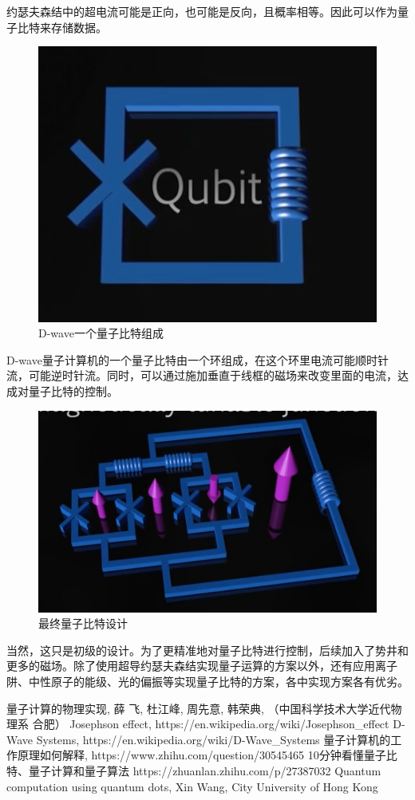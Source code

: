 \documentclass{article}
\begin{document}
约瑟夫森结中的超电流可能是正向，也可能是反向，且概率相等。因此可以作为量子比特来存储数据。
\begin{figure}[H]
  \centering
  \includegraphics[width=0.5\linewidth]{figures/D-wave一个量子比特组成}
  \caption{D-wave一个量子比特组成}
\end{figure}
D-wave量子计算机的一个量子比特由一个环组成，在这个环里电流可能顺时针流，可能逆时针流。同时，可以通过施加垂直于线框的磁场来改变里面的电流，达成对量子比特的控制。
\begin{figure}[H]
  \centering
  \includegraphics[width=0.7\linewidth]{figures/最终量子比特设计}
  \caption{最终量子比特设计}
\end{figure}
当然，这只是初级的设计。为了更精准地对量子比特进行控制，后续加入了势井和更多的磁场。除了使用超导约瑟夫森结实现量子运算的方案以外，还有应用离子阱、中性原子的能级、光的偏振等实现量子比特的方案，各中实现方案各有优劣。

\begin{thebibliography}{99}  
量子计算的物理实现, 薛 飞, 杜江峰, 周先意, 韩荣典, （中国科学技术大学近代物理系 合肥）
Josephson effect, https://en.wikipedia.org/wiki/Josephson\_effect
D-Wave Systems, https://en.wikipedia.org/wiki/D-Wave\_Systems
量子计算机的工作原理如何解释, https://www.zhihu.com/question/30545465
10分钟看懂量子比特、量子计算和量子算法 https://zhuanlan.zhihu.com/p/27387032
Quantum computation using quantum dots, Xin Wang, City University of Hong Kong
\end{thebibliography}
\end{document}
